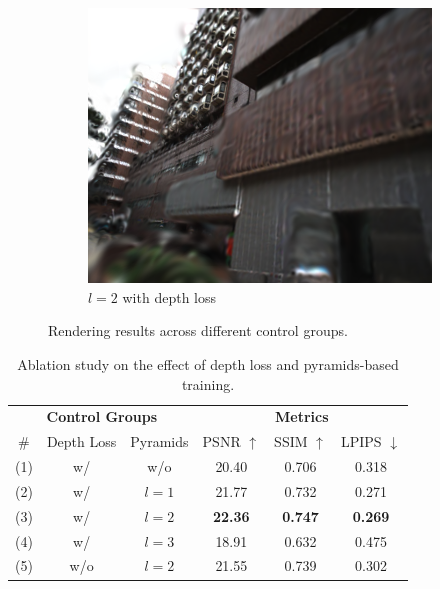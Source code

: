 \documentclass[lettersize,journal]{IEEEtran}
\begin{document}
\begin{figure}[h]
\begin{subfigure}{0.15\textwidth}
        \label{fig:ablationwd3}
    \end{subfigure}
    \hspace{0.0001\textwidth} %
    \begin{subfigure}{0.15\textwidth}
        \includegraphics[width=\linewidth]{image/ablation/wd2.png}
        \caption{$l=2$ with depth loss}
        \label{fig:ablationwd2}
    \end{subfigure}
    \hspace{0.0001\textwidth} %
    \caption{Rendering results across different control groups.}
    \label{fig:ablation}
\end{figure}


\begin{table}[h]
    \centering
    \renewcommand{\arraystretch}{1.0} %
    \setlength{\tabcolsep}{9pt} %
    \caption{Ablation study on the effect of depth loss and pyramids-based training.}
    \label{tab:ablation}
    \begin{tabular}{@{}cccccc@{}}
        \toprule
        \multicolumn{3}{c}{\textbf{Control Groups}} & \multicolumn{3}{c}{\textbf{Metrics}} \\
        \cmidrule(lr){1-3} \cmidrule(lr){4-6}
        \# & Depth Loss & Pyramids & PSNR $\uparrow$ & SSIM $\uparrow$ & LPIPS $\downarrow$ \\
        \midrule
        (1) & w/ & w/o & 20.40 & 0.706 & 0.318 \\
        (2) & w/ & $l=1$ & 21.77 & 0.732 & 0.271 \\
        (3) & w/ & $l=2$ & \textbf{22.36} & \textbf{0.747} & \textbf{0.269} \\
        (4) & w/ & $l=3$ & 18.91 & 0.632 & 0.475 \\
        (5) & w/o & $l=2$ & 21.55 & 0.739 & 0.302 \\
        \bottomrule
    \end{tabular}
    \captionsetup{justification=centering, labelsep=colon} %
\end{table}
\end{document}
